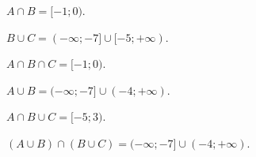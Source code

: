 \begin{bt}
{\begin{center}
	\end{center}
	\begin{listEX}[2]
	\item $A \cap B = [-1;0)$.
	\item $B \cup C = (-\infty;-7]\cup [-5;+\infty)$.
	\item $A \cap B\cap C= [-1;0)$.
	\item $A \cup B = (-\infty;-7]\cup (-4;+\infty)$.
	\item $A \cap B \cup C = [-5;3)$.
	\item $(A \cup B)\cap(B \cup C) = (-\infty;-7]\cup (-4;+\infty)$.
	\end{listEX}
	}
\end{bt}

